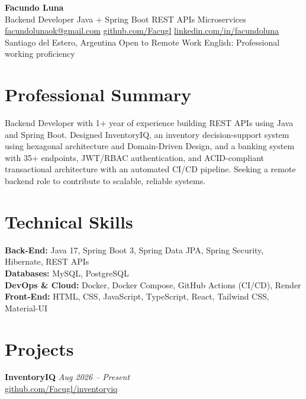 \documentclass[11pt,a4paper]{article}
\newcommand{\entry}[3]{%
  \noindent\textbf{#1} \hfill \textit{#2} \\
  #3
}
\begin{document}
\enlargethispage{2\baselineskip}

\begin{center}
  {\LARGE \textbf{Facundo Luna}}\\[2pt]
  {\large Backend Developer \textbar{} Java + Spring Boot \textbar{} REST APIs \textbar{} Microservices}\\[4pt]
  \small
  \href{mailto:facundolunaok@gmail.com}{facundolunaok@gmail.com} \textbar{}
  \href{https://github.com/Facugl}{github.com/Facugl} \textbar{}
  \href{https://linkedin.com/in/facundoluna}{linkedin.com/in/facundoluna} \\[2pt]
  Santiago del Estero, Argentina \textbar{} Open to Remote Work \textbar{} English: Professional working proficiency
\end{center}

\section*{Professional Summary}
Backend Developer with 1+ year of experience building REST APIs using Java and Spring Boot. Designed InventoryIQ, an inventory decision-support system using hexagonal architecture and Domain-Driven Design, and a banking system with 35+ endpoints, JWT/RBAC authentication, and ACID-compliant transactional architecture with an automated CI/CD pipeline. Seeking a remote backend role to contribute to scalable, reliable systems.

\section*{Technical Skills}
\noindent\textbf{Back-End:} Java 17, Spring Boot 3, Spring Data JPA, Spring Security, Hibernate, REST APIs \\
\textbf{Databases:} MySQL, PostgreSQL \\
\textbf{DevOps \& Cloud:} Docker, Docker Compose, GitHub Actions (CI/CD), Render \\
\textbf{Front-End:} HTML, CSS, JavaScript, TypeScript, React, Tailwind CSS, Material-UI

\section*{Projects}

\entry{InventoryIQ}{Aug 2026 -- Present}{\href{https://github.com/Facugl/inventoryiq}{github.com/Facugl/inventoryiq}}
\vspace{3pt}
\end{document}
